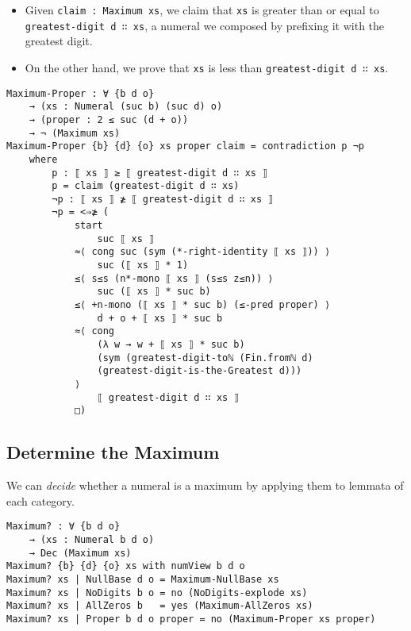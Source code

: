 \documentclass[\main/thesis.tex]{subfiles}
\begin{document}
\begin{itemize}
    \item Given {\lstinline|claim : Maximum xs|}, we claim that {\lstinline|xs|}
        is greater than or equal to {\lstinline|greatest-digit d ∷ xs|}, a numeral
        we composed by prefixing it with the greatest digit.
    \item On the other hand, we prove that {\lstinline|xs|} is less than
        {\lstinline|greatest-digit d ∷ xs|}.
\end{itemize}

\begin{lstlisting}
Maximum-Proper : ∀ {b d o}
    → (xs : Numeral (suc b) (suc d) o)
    → (proper : 2 ≤ suc (d + o))
    → ¬ (Maximum xs)
Maximum-Proper {b} {d} {o} xs proper claim = contradiction p ¬p
    where
        p : ⟦ xs ⟧ ≥ ⟦ greatest-digit d ∷ xs ⟧
        p = claim (greatest-digit d ∷ xs)
        ¬p : ⟦ xs ⟧ ≱ ⟦ greatest-digit d ∷ xs ⟧
        ¬p = <⇒≱ (
            start
                suc ⟦ xs ⟧
            ≈⟨ cong suc (sym (*-right-identity ⟦ xs ⟧)) ⟩
                suc (⟦ xs ⟧ * 1)
            ≤⟨ s≤s (n*-mono ⟦ xs ⟧ (s≤s z≤n)) ⟩
                suc (⟦ xs ⟧ * suc b)
            ≤⟨ +n-mono (⟦ xs ⟧ * suc b) (≤-pred proper) ⟩
                d + o + ⟦ xs ⟧ * suc b
            ≈⟨ cong
                (λ w → w + ⟦ xs ⟧ * suc b)
                (sym (greatest-digit-toℕ (Fin.fromℕ d)
                (greatest-digit-is-the-Greatest d)))
            ⟩
                ⟦ greatest-digit d ∷ xs ⟧
            □)
\end{lstlisting}

\subsection{Determine the Maximum}

We can \textit{decide} whether a numeral is a maximum by applying them to
lemmata of each category.

\begin{lstlisting}
Maximum? : ∀ {b d o}
    → (xs : Numeral b d o)
    → Dec (Maximum xs)
Maximum? {b} {d} {o} xs with numView b d o
Maximum? xs | NullBase d o = Maximum-NullBase xs
Maximum? xs | NoDigits b o = no (NoDigits-explode xs)
Maximum? xs | AllZeros b   = yes (Maximum-AllZeros xs)
Maximum? xs | Proper b d o proper = no (Maximum-Proper xs proper)
\end{lstlisting}
\end{document}
